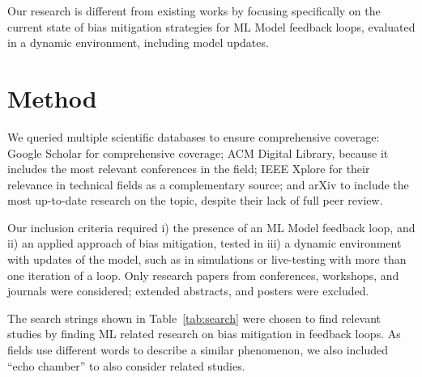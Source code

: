 \documentclass[11pt]{article}
\begin{document}
Our research is different from existing works by focusing specifically on the current state of bias mitigation strategies for ML Model feedback loops, evaluated in a dynamic environment, including model updates.


\section{Method}

We queried multiple scientific databases to ensure comprehensive coverage: Google Scholar for comprehensive coverage; ACM Digital Library, because it includes the most relevant conferences in the field; IEEE Xplore for their relevance in technical fields as a complementary source; and arXiv to include the most up-to-date research on the topic, despite their lack of full peer review.

Our inclusion criteria required i) the presence of an ML Model feedback loop, and ii) an applied approach of bias mitigation, tested in iii) a dynamic environment with updates of the model, such as in simulations or live-testing with more than one iteration of a loop. Only research papers from conferences, workshops, and journals were considered; extended abstracts, and posters were excluded.

The search strings shown in Table~\ref{tab:search} were chosen to find relevant studies by finding ML related research on bias mitigation in feedback loops. As fields use different words to describe a similar phenomenon, we also included ``echo chamber'' to also consider related studies.
\end{document}

